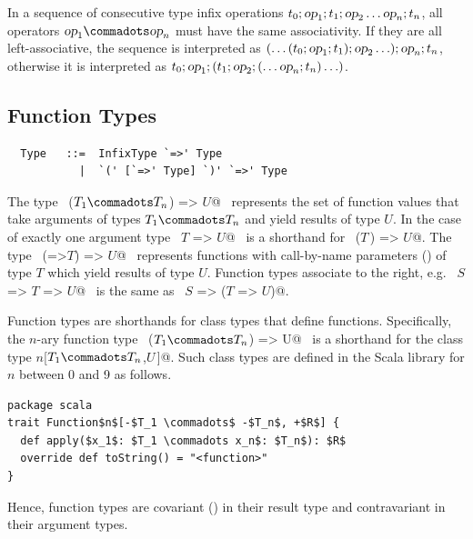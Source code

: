In a sequence of consecutive type infix operations $t_0; \mbox{\sl op}_1; t_1;
\mbox{\sl op}_2 \ldots \mbox{\sl op}_n; t_n$, all operators $\op_1 \commadots \op_n$ must have the same
associativity. If they are all left-associative, the sequence is
interpreted as $(\ldots(t_0;\mbox{\sl op}_1;t_1);\mbox{\sl op}_2\ldots);\mbox{\sl op}_n;t_n$,
otherwise it is interpreted as $t_0;\mbox{\sl op}_1;(t_1;\mbox{\sl op}_2;(\ldots\mbox{\sl op}_n;t_n)\ldots)$.


\subsection{Function Types}
\label{sec:function-types}

\syntax\begin{lstlisting}
  Type   ::=  InfixType `=>' Type
           |  `(' [`=>' Type] `)' `=>' Type
\end{lstlisting}
The type ~\lstinline@($T_1 \commadots T_n$) => $U$@~ represents the set of function
values that take arguments of types $T_1 \commadots T_n$ and yield
results of type $U$.  In the case of exactly one argument type
~\lstinline@$T$ => $U$@~ is a shorthand for ~\lstinline@($T\,$) => $U$@.  
The type ~\lstinline@(=>$T$) => $U$@~ represents functions with
call-by-name parameters () of type $T$ which yield
results of type $U$.
Function types associate to the right, e.g.
~\lstinline@$S$ => $T$ => $U$@~ is the same as 
~\lstinline@$S$ => ($T$ => $U$)@.

Function types are shorthands for class types that define 
functions.  Specifically, the $n$-ary function type 
~\lstinline@($T_1 \commadots T_n$) => U@~ is a shorthand for the class type
\lstinline@Function$n$[$T_1 \commadots T_n$,$U\,$]@. Such class
types are defined in the Scala library for $n$ between 0 and 9 as follows.
\begin{lstlisting}
package scala 
trait Function$n$[-$T_1 \commadots$ -$T_n$, +$R$] {
  def apply($x_1$: $T_1 \commadots x_n$: $T_n$): $R$ 
  override def toString() = "<function>" 
}
\end{lstlisting}
Hence, function types are covariant () in their
result type and contravariant in their argument types.

